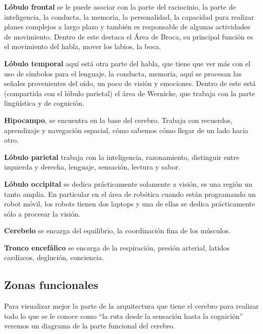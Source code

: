 \begin{description}
 \item \textbf{Lóbulo frontal} se le puede asociar con la parte del raciocinio,  la parte de inteligencia, la conducta, la memoria, la personalidad, la capacidad para realizar planes complejos a largo plazo y también es responsable de algunas actividades de movimiento. Dentro de este destaca el Área de Broca, su principal función es el movimiento del habla, mover los labios, la boca.
 
 \item \textbf{Lóbulo temporal} aquí está otra parte del habla, que tiene que ver más con el uso de símbolos para el lenguaje, la conducta, memoria, aquí se procesan las señales provenientes del oído, un poco de visión y emociones. Dentro de este está (compartida con el lóbulo parietal) el área de Wernicke, que trabaja con la parte lingüística y de cognición.
 
 \item \textbf{Hipocampo}, se encuentra en la base del cerebro. Trabaja con recuerdos, aprendizaje y navegación espacial, cómo sabemos cómo llegar de un lado hacia otro.
 
 \item \textbf{Lóbulo parietal} trabaja con la inteligencia, razonamiento, distinguir entre izquierda y derecha, lenguaje, sensación, lectura y sabor. 
 
 \item \textbf{Lóbulo occipital} se dedica prácticamente solamente a visión, es una región un tanto amplia. En particular en el área de robótica cuando están programando un robot móvil, los robots tienen dos laptops y una de ellas se dedica prácticamente sólo a procesar la visión.
 
 \item \textbf{Cerebelo} se encarga del equilibrio, la coordinación fina de los músculos.
 
 \item \textbf{Tronco encefálico} se encarga de la respiración, presión arterial, latidos cardíacos, deglución, conciencia.
\end{description}


\subsection{Zonas funcionales}
Para visualizar mejor la parte de la arquitectura que tiene el cerebro para realizar todo lo que se le conoce como ``la ruta desde la sensación hasta la cognición'' veremos un diagrama de la parte funcional del cerebro.  


